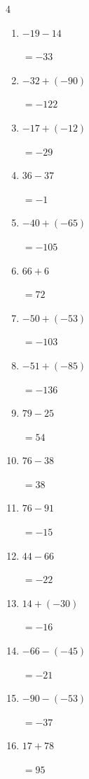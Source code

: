 \begin{multicols}{4}
\begin{enumerate}
        $=-47$

  \item $-19-14$

        $=-33$

  \item $-32+(-90)$

        $=-122$

  \item $-17+(-12)$

        $=-29$

  \item $36-37$

        $=-1$

  \item $-40+(-65)$

        $=-105$

  \item $66+6$

        $=72$

  \item $-50+(-53)$

        $=-103$

  \item $-51+(-85)$

        $=-136$

  \item $79-25$

        $=54$

  \item $76-38$

        $=38$

  \item $76-91$

        $=-15$

\columnbreak %

\resetques

  \item $44-66$

        $=-22$

  \item $14+(-30)$

        $=-16$

  \item $-66-(-45)$

        $=-21$

  \item $-90-(-53)$

        $=-37$

  \item $17+78$

        $=95$


\end{enumerate}
\end{multicols}
